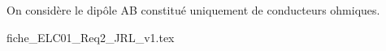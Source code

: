 
\finEntrainement



\hauteurLargeurCadreReponse		{10mm}{25mm}
\typeEntrainement				{} %
\initialisationEntrainement

                                \initialisationPartieGauche %
On considère le dipôle AB constitué uniquement de conducteurs ohmiques.  

\medskip

                                \initialisationPartieDroite %
\begin{center}
{fiche_ELC01_Req2_JRL_v1.tex}
\end{center}
                               \finalisationDuPartageDePage %

